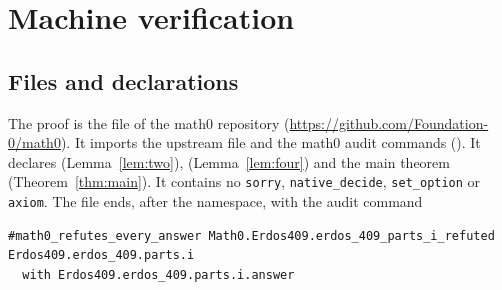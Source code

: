 \documentclass[11pt]{amsart}
\theoremstyle{plain}
\theoremstyle{definition}
\begin{document}
\section{Machine verification}\label{sec:lean}

\subsection*{Files and declarations}
The proof is the file  of the math0 repository (\url{https://github.com/Foundation-0/math0}). It imports the upstream file  and the math0 audit commands (). It declares  (Lemma~\ref{lem:two}),  (Lemma~\ref{lem:four}) and the main theorem  (Theorem~\ref{thm:main}). It contains no \texttt{sorry}, \texttt{native\_decide}, \texttt{set\_option} or \texttt{axiom}. The file ends, after the namespace, with the audit command
\begin{lstlisting}
#math0_refutes_every_answer Math0.Erdos409.erdos_409_parts_i_refuted Erdos409.erdos_409.parts.i
  with Erdos409.erdos_409.parts.i.answer
\end{lstlisting}
\end{document}
